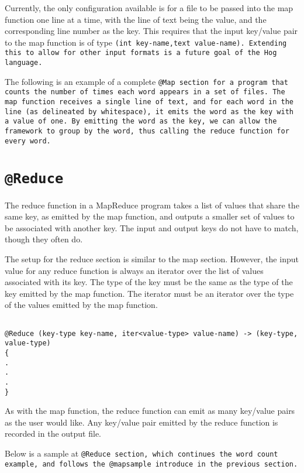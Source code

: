\documentclass{book}
\begin{document}
Currently, the only configuration available is for a file to be passed into the map
function one line at a time, with the line of text being the value, and the
corresponding line number as the key. This requires that the input key/value pair
to the map function is of type \tt (int key‐name,text value‐name)\rm. Extending
this to allow for other input formats is a future goal of the Hog language.

The following is an example of a complete \tt @Map \rm section for a program that
counts the number of times each word appears in a set of files. The map function
receives a single line of text, and for each word in the line (as delineated by
whitespace), it emits the word as the key with a value of one. By emitting the word
as the key, we can allow the framework to group by the word, thus calling the
reduce function for every word.


\section{\tt @Reduce \rm} %
\label{sec:tt_reduce_rm}

The reduce function in a MapReduce program takes a list of values that share the
same key, as emitted by the map function, and outputs a smaller set of values to be
associated with another key. The input and output keys do not have to match, though
they often do.

The setup for the reduce section is similar to the map section. However, the input
value for any reduce function is always an iterator over the list of values
associated with its key. The type of the key must be the same as the type of the
key emitted by the map function. The iterator must be an iterator over the type of
the values emitted by the map function.

\begin{verbatim}

@Reduce (key-type key-name, iter<value-type> value-name) -> (key-type, value-type)
{
.
.
.
}
\end{verbatim}

As with the map function, the reduce function can emit as many key/value pairs as
the user would like. Any key/value pair emitted by the reduce function is recorded
in the output file.

Below is a sample at \tt @Reduce \rm section, which continues the word count
example, and follows the @mapsample introduce in the previous section.
\end{document}
